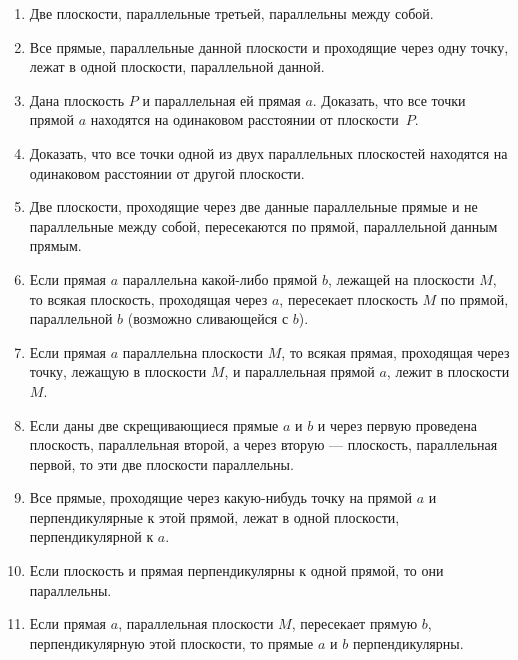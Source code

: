 \begin{enumerate}

\item
Две плоскости, параллельные третьей, параллельны между собой.

\item
Все прямые, параллельные данной плоскости и проходящие через одну точку, лежат в одной плоскости, параллельной данной.

\item Дана плоскость $P$ и параллельная ей прямая $a$.
Доказать, что все точки прямой $a$ находятся на одинаковом расстоянии от плоскости~$P$.

\item
Доказать, что все точки одной из двух параллельных плоскостей находятся на одинаковом расстоянии от другой плоскости.

\item
Две плоскости, проходящие через две данные параллельные прямые и не параллельные между собой, пересекаются по прямой, параллельной данным прямым.

\item
Если прямая $a$ параллельна какой-либо прямой $b$, лежащей на плоскости $M$, то всякая плоскость, проходящая через $a$, пересекает плоскость $M$ по прямой, параллельной $b$ (возможно сливающейся с $b$).

\item
Если прямая $a$ параллельна плоскости $M$, то всякая прямая, проходящая через точку, лежащую в плоскости $M$, и параллельная прямой $a$, лежит в плоскости $M$.

\item
Если даны две скрещивающиеся прямые $a$ и $b$ и через первую проведена плоскость, параллельная второй, а через вторую — плоскость, параллельная первой, то эти две плоскости параллельны.

\item
Все прямые, проходящие через какую-нибудь точку на прямой $a$ и перпендикулярные к этой прямой, лежат в одной плоскости, перпендикулярной к $a$.

\item
Если плоскость и прямая перпендикулярны к одной прямой, то они параллельны.

\item
Если прямая $a$, параллельная плоскости $M$, пересекает прямую $b$, перпендикулярную этой плоскости, то прямые $a$ и $b$ перпендикулярны.
\end{enumerate}

